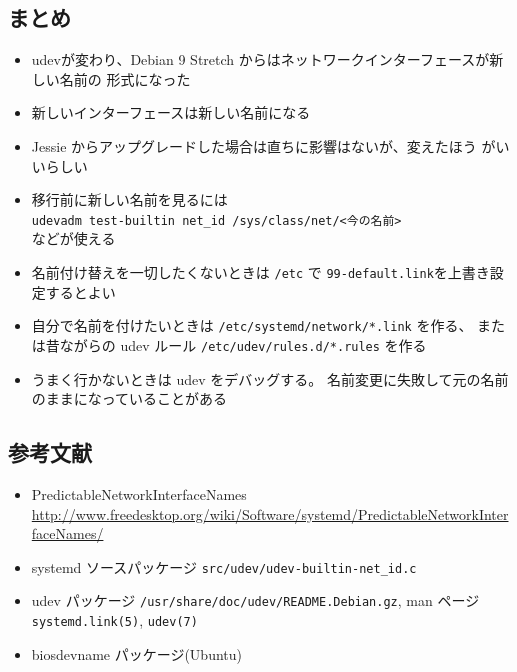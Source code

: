 \documentclass[mingoth,a4paper]{jsarticle}
\begin{document}
\subsection{まとめ}
\begin{itemize}
 \item udevが変わり、Debian 9 Stretch からはネットワークインターフェースが新しい名前の
       形式になった
 \item 新しいインターフェースは新しい名前になる
 \item Jessie からアップグレードした場合は直ちに影響はないが、変えたほう
       がいいらしい
 \item 移行前に新しい名前を見るには\\
 \texttt{udevadm test-builtin net\_id /sys/class/net/<今の名前>}\\
 などが使える
 \item 名前付け替えを一切したくないときは \texttt{/etc} で
       \texttt{99-default.link}を上書き設定するとよい
 \item 自分で名前を付けたいときは
       \texttt{/etc/systemd/network/*.link} を作る、
       または昔ながらの udev ルール
       \texttt{/etc/udev/rules.d/*.rules} を作る
 \item うまく行かないときは udev をデバッグする。
       名前変更に失敗して元の名前のままになっていることがある
\end{itemize}



\subsection{参考文献}
\begin{itemize}
 \item PredictableNetworkInterfaceNames\\
      \url{http://www.freedesktop.org/wiki/Software/systemd/PredictableNetworkInterfaceNames/}
 \item systemd ソースパッケージ \verb|src/udev/udev-builtin-net_id.c|
 \item udev パッケージ \verb|/usr/share/doc/udev/README.Debian.gz|, man
       ページ \verb|systemd.link(5)|, \verb|udev(7)|
 \item biosdevname パッケージ(Ubuntu)
\end{itemize}


%

\end{document}
